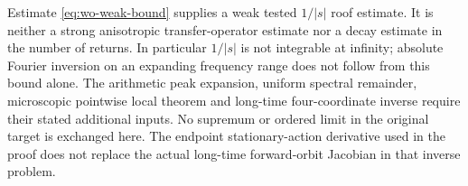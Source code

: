 Estimate \eqref{eq:wo-weak-bound} supplies a weak tested
$1/|s|$ roof estimate.  It is neither a strong anisotropic
transfer-operator estimate nor a decay estimate in the number
of returns.  In particular $1/|s|$ is not integrable at infinity;
absolute Fourier inversion on an expanding frequency range
does not follow from this bound alone.  The arithmetic peak
expansion, uniform spectral remainder, microscopic pointwise
local theorem and long-time four-coordinate inverse require
their stated additional inputs.  No supremum or ordered limit
in the original target is exchanged here.  The endpoint
stationary-action derivative used in the proof does not
replace the actual long-time forward-orbit Jacobian in that
inverse problem.
